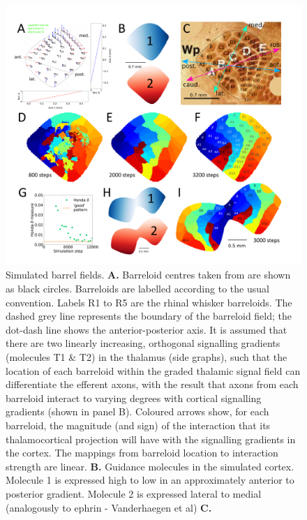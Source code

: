 \documentclass[9pt,twocolumn,twoside,lineno]{pnas-new}
\begin{document}
\begin{figure}
\begin{center}
\includegraphics[width=\textwidth]{./MainFig.png}
\end{center}
\caption{Simulated barrel fields. \textbf{A.} Barreloid centres taken from
  \cite{haidarliu_size_2001} are shown as black circles. Barreloids are
  labelled according to the usual convention. Labels R1 to R5 are the rhinal
  whisker barreloids. The dashed grey line represents the boundary of the
  barreloid field; the dot-dash line shows the anterior-posterior axis. It is
  assumed that there are two linearly increasing, orthogonal signalling
  gradients (molecules T1 \& T2) in the thalamus (side graphs), such that the
  location of each barreloid within the graded thalamic signal field can
  differentiate the efferent axons, with the result that axons from each
  barreloid interact to varying degrees with cortical signalling gradients
  (shown in panel B). Coloured arrows show, for each barreloid, the magnitude
  (and sign) of the interaction that its thalamocortical projection will have
  with the signalling gradients in the cortex. The mappings from barreloid
  location to interaction strength are linear. \textbf{B.} Guidance molecules
  in the simulated cortex. Molecule 1 is expressed high to low in an
  approximately anterior to posterior gradient. Molecule 2 is expressed
  lateral to medial (analogously to ephrin - Vanderhaegen et al) \textbf{C.}
}
\end{figure}
\end{document}
